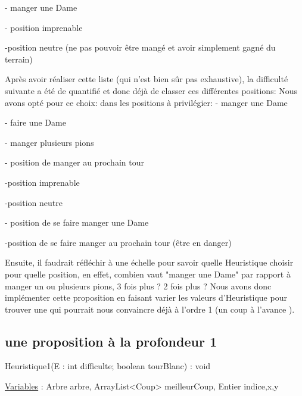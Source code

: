 \documentclass[12,french]{report}
\begin{document}
- manger une Dame

- position imprenable
 
 -position neutre (ne pas pouvoir être mangé et avoir simplement gagné du terrain)

Après avoir réaliser cette liste (qui n'est bien sûr pas exhaustive), la difficulté suivante a été de quantifié et donc déjà de classer ces différentes positions:
Nous avons opté pour ce choix:
dans les positions à privilégier:
- manger une Dame

- faire une Dame

- manger plusieurs pions

- position de manger au prochain tour

-position imprenable

-position neutre

- position de se faire manger une Dame

-position de se faire manger au prochain tour (être en danger)


Ensuite, il faudrait réfléchir à une échelle pour savoir quelle Heuristique choisir pour quelle position, en effet, combien vaut "manger une Dame" par rapport à manger un ou plusieurs pions, 3 fois plus ? 2 fois plus ?
Nous avons donc implémenter cette proposition en faisant varier les valeurs d'Heuristique pour trouver une qui pourrait nous convaincre déjà à l'ordre 1 (un coup à l'avance ).


\subsection{une proposition à la profondeur 1}

\begin{algorithm}
	\caption{Heuristique1(E : int difficulte; boolean tourBlanc) : void}
	\begin{algorithmic}
	\State \underline{Variables} : Arbre arbre, ArrayList<Coup> meilleurCoup, Entier indice,x,y
	\State
	\State 
	\end{algorithmic}
\end{algorithm}\vspace{0.4cm}
\end{document}
